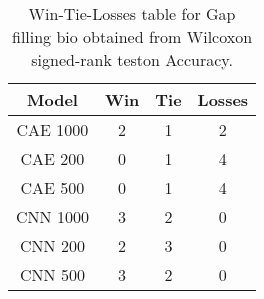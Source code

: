 \begin{table}[H]
\centering
\begin{tabular}{|c|c|c|c|}

\textbf{Model} &  \textbf{Win} &  \textbf{Tie} &  \textbf{Losses} \\
\hline

      CAE 1000 &             2 &             1 &                2 \\
\hline
       CAE 200 &             0 &             1 &                4 \\
\hline
       CAE 500 &             0 &             1 &                4 \\
\hline
      CNN 1000 &             3 &             2 &                0 \\
\hline
       CNN 200 &             2 &             3 &                0 \\
\hline
       CNN 500 &             3 &             2 &                0 \\
\hline

\end{tabular}
\caption{Win-Tie-Losses table for Gap filling bio obtained from Wilcoxon signed-rank teston Accuracy.}
\label{tab:gap_filling_bio_model_comparison}
\end{table}